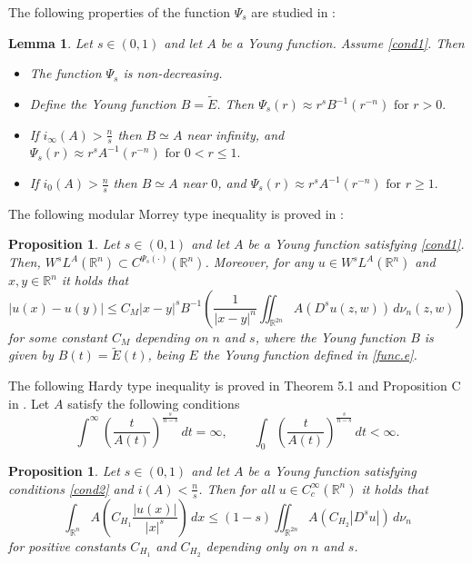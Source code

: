\documentclass[12pt,reqno]{amsart}
\newtheorem{lem}[thm]{Lemma}
\newtheorem{prop}[thm]{Proposition}
\theoremstyle{definition}
\theoremstyle{remark}
\numberwithin{equation}{section}
\begin{document}
The following properties of the function $\Psi_s$ are studied in \cite[Proposition 2.1]{ACPS24}:
\begin{lem} \label{lema1}
Let $s\in (0,1)$ and let $A$ be a Young function. Assume \eqref{cond1}. Then

\begin{itemize}
  \setlength\itemsep{0.5em}
\item[(i)] The function $\Psi_s$ is non-decreasing.

\item[(ii)] Define the Young function $B=\tilde E$. Then
$
\Psi_s(r)\approx r^s B^{-1}(r^{-n}) \text{ for } r>0.
$

\item[(iii)] If $i_\infty(A)>\frac{n}{s}$ then $B\simeq A$ near infinity, and
$
\Psi_s(r) \approx  r^s A^{-1}(r^{-n})  \text{ for } 0<r\leq 1.
$

\item[(iv)] If $i_0(A)>\frac{n}{s}$ then $B\simeq A$ near $0$, and
$
\Psi_s(r) \approx  r^s A^{-1}(r^{-n}) \text{ for } r\geq 1.
$ 
\end{itemize}
 
\end{lem}

The following modular Morrey type inequality is proved in \cite[Remark 4.3]{ACPS24}:
\begin{prop} \label{morrey}
Let $s\in (0,1)$ and let $A$ be a Young function satisfying  \eqref{cond1}. Then, $W^s L^A(\mathbb{R}^n)\subset C^{\Psi_s(\cdot)}(\mathbb{R}^n)$. Moreover,  for any $u\in W^s L^A(\mathbb{R}^n)$ and $x,y\in \mathbb{R}^n$ it holds that
$$
|u(x)-u(y)|\leq C_M |x-y|^s B^{-1}\left( \frac{1}{|x-y|^n} \iint_{\mathbb{R}^{2n}} A(D^s u(z,w))\,d\nu_n(z,w) \right)
$$
for some constant $C_M$ depending on $n$ and $s$, where the Young function $B$ is given by $B(t)=\tilde E(t)$, being $E$ the Young function defined in \eqref{func.e}.
\end{prop}
 
 
\noindent The following Hardy type inequality is proved in Theorem 5.1 and Proposition C in \cite{ACPS2}. Let $A$ satisfy the following conditions
\begin{equation} \label{cond2}
\int^\infty \left(\frac{t}{A(t)}\right)^\frac{s}{n-s}\,dt=\infty, \qquad 
\int_0 \left(\frac{t}{A(t)}\right)^\frac{s}{n-s}\,dt<\infty.
\end{equation}
 

\begin{prop} \label{hardy}
Let $s\in (0,1)$ and let $A$ be a Young function satisfying conditions \eqref{cond2} and $i(A)<\frac{n}{s}$. Then for all $u\in C_c^\infty(\mathbb{R}^n)$  it holds that
$$
 \int_{\mathbb{R}^n} A\left(C_{H_1}\frac{|u(x)|}{|x|^s}\right)\,dx \leq (1-s) \iint_{\mathbb{R}^{2n}} A(C_{H_2} |D^s u|) \,d\nu_n
$$
for positive constants $C_{H_1}$ and $C_{H_2}$ depending only on $n$ and $s$.
\end{prop}
\end{document}

